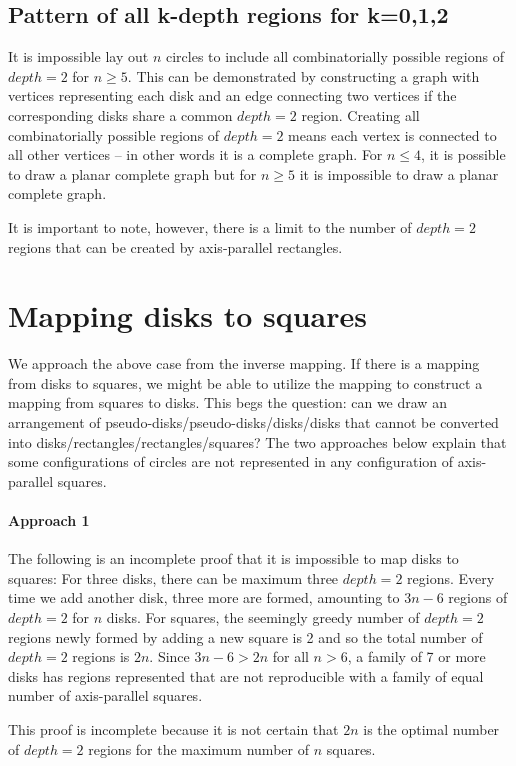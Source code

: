 \documentclass{NSF}
\begin{document}
\subsection{Pattern of all k-depth regions for k=0,1,2 }
It is impossible lay out $n$ circles to include all combinatorially possible regions of $depth=2$ for $n \geq 5$. This can be demonstrated by constructing a graph with vertices representing each disk and an edge connecting two vertices if the corresponding disks share a common $depth=2$ region. Creating all combinatorially possible regions of $depth=2$ means each vertex is connected to all other vertices -- in other words it is a complete graph. For $n \leq 4$, it is possible to draw a planar complete graph but for $n \geq 5$ it is impossible to draw a planar complete graph.

It is important to note, however, there is  a limit to the number of $depth=2$ regions that can be created by axis-parallel rectangles. 

\section{Mapping disks to squares}
We approach the above case from the inverse mapping. If there is a mapping from disks to squares, we might be able to utilize the mapping to construct a mapping from squares to disks. This begs the question: can we draw an arrangement of pseudo-disks/pseudo-disks/disks/disks that cannot be converted into disks/rectangles/rectangles/squares? The two approaches below explain that some configurations of circles are not represented in any configuration of axis-parallel squares.

\paragraph{Approach 1} The following is an incomplete proof that it is impossible to map disks to squares:
For three disks, there can be maximum three $depth=2$ regions. Every time we add another disk, three more are formed, amounting to $3n-6$ regions of $depth=2$   for $n$ disks. 
For squares, the seemingly greedy number of $depth=2$  regions newly formed by adding a new square is 2 and so the total number of $depth=2$ regions is $2n$.
Since $3n-6 > 2n$ for all $n > 6$, a family of 7 or more disks has regions represented that are not reproducible with a family of equal number of axis-parallel squares.

This proof is incomplete because it is not certain that $2n$ is the optimal number of $depth=2$ regions for the maximum number of $n$ squares.
\end{document}
